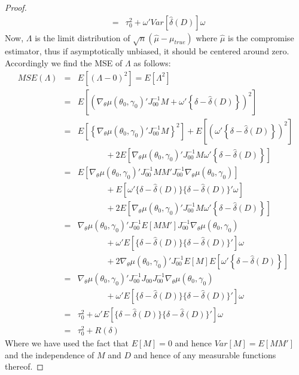 \documentclass[12pt]{article}
\theoremstyle{definition}
\begin{document}
\begin{proof}
\begin{eqnarray*}
			&=& \tau^2_0 + \omega'Var\left[\hat{\delta}(D)  \right]\omega
\end{eqnarray*}
Now, $\Lambda$ is the limit distribution of $\sqrt{n}(\hat{\mu}-\mu_{true})$ where $\hat{\mu}$ is the compromise estimator, thus if asymptotically unbiased, it should be centered around zero. Accordingly we find the MSE of $\Lambda$ as follows:
	\begin{eqnarray*}
		MSE(\Lambda) &=& E\left[(\Lambda - 0)^2  \right] = E\left[\Lambda^2  \right]\\
					&=& E\left[\left( \nabla_\theta \mu(\theta_0,\gamma_0)' J_{00}^{-1} M + \omega' \left\{\delta - \hat{\delta}(D)\right\}\right)^2 \right]\\
					&=& E\left[\left\{\nabla_\theta \mu(\theta_0,\gamma_0)' J_{00}^{-1} M \right\}^2\right] + E\left[\left(\omega' \left\{\delta - \hat{\delta}(D)\right\}\right)^2 \right]\\
		&& \;\;\;\;\;\;\;\;\;\;\;\;+ 2E \left[\nabla_\theta \mu(\theta_0,\gamma_0)' J_{00}^{-1} M \omega' \left\{\delta - \hat{\delta}(D)\right\} \right]\\
		&=& E\left[\nabla_\theta \mu(\theta_0,\gamma_0)' J_{00}^{-1} M M' J_{00}^{-1}\nabla_\theta \mu(\theta_0,\gamma_0)\right]\\
			&& \;\;\;\;\;\;\;\;\;\;\;\; + E\left[\omega' \{\delta - \hat{\delta}(D)\}\{\delta - \hat{\delta}(D)\}' \omega\right]\\
		&& \;\;\;\;\;\;\;\;\;\;\;\;+ 2E \left[\nabla_\theta \mu(\theta_0,\gamma_0)' J_{00}^{-1} M \omega' \left\{\delta - \hat{\delta}(D)\right\} \right]\\
		&=&\nabla_\theta \mu(\theta_0,\gamma_0)' J_{00}^{-1} E\left[M M' \right]J_{00}^{-1}\nabla_\theta \mu(\theta_0,\gamma_0)\\
			&& \;\;\;\;\;\;\;\;\;\;\;\; +\omega'  E\left[\{\delta - \hat{\delta}(D)\}\{\delta - \hat{\delta}(D)\}' \right]\omega\\
		&& \;\;\;\;\;\;\;\;\;\;\;\;+ 2\nabla_\theta \mu(\theta_0,\gamma_0)' J_{00}^{-1}E \left[ M\right]E\left[ \omega' \left\{\delta - \hat{\delta}(D)\right\} \right]\\
		&=&\nabla_\theta \mu(\theta_0,\gamma_0)' J_{00}^{-1} J_{00}J_{00}^{-1}\nabla_\theta \mu(\theta_0,\gamma_0)\\
			&& \;\;\;\;\;\;\;\;\;\;\;\; +\omega'  E\left[\{\delta - \hat{\delta}(D)\}\{\delta - \hat{\delta}(D)\}' \right]\omega\\
		&=&\tau_0^2+\omega'  E\left[\{\delta - \hat{\delta}(D)\}\{\delta - \hat{\delta}(D)\}' \right]\omega\\
	&=& \tau^2_0 + R(\delta)
\end{eqnarray*}
Where we have used the fact that $E[M]=0$ and hence $Var[M] = E[MM']$ and the independence of $M$ and $D$ and hence of any measurable functions thereof.
\end{proof}
\end{document}
